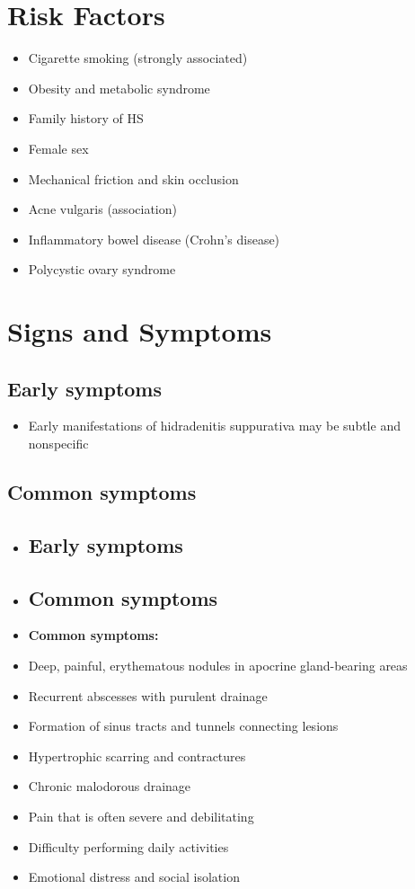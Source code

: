 \section{Risk Factors}

\begin{itemize}[noitemsep]
  \item Cigarette smoking (strongly associated)
  \item Obesity and metabolic syndrome
  \item Family history of HS
  \item Female sex
  \item Mechanical friction and skin occlusion
  \item Acne vulgaris (association)
  \item Inflammatory bowel disease (Crohn's disease)
  \item Polycystic ovary syndrome
\end{itemize}

\section{Signs and Symptoms}

\subsection{Early symptoms}
\begin{itemize}[noitemsep]
  \item Early manifestations of hidradenitis suppurativa may be subtle and nonspecific
\end{itemize}

\subsection{Common symptoms}
\begin{itemize}[noitemsep]
  \item \subsection{Early symptoms}
  \item \subsection{Common symptoms}
  \item \textbf{Common symptoms:}
  \item Deep, painful, erythematous nodules in apocrine gland-bearing areas
  \item Recurrent abscesses with purulent drainage
  \item Formation of sinus tracts and tunnels connecting lesions
  \item Hypertrophic scarring and contractures
  \item Chronic malodorous drainage
  \item Pain that is often severe and debilitating
  \item Difficulty performing daily activities
  \item Emotional distress and social isolation
\end{itemize}

